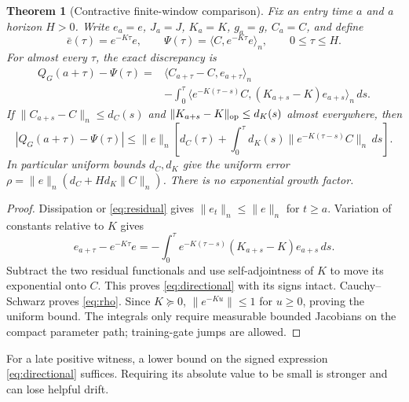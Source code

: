 \documentclass[10pt]{article}
\newtheorem{theorem}{Theorem}[section]
\newcommand{\ip}[2]{\langle #1,#2\rangle_n}
\begin{document}
\begin{theorem}[Contractive finite-window comparison]\label{thm:comparison}
Fix an entry time $a$ and a horizon $H>0$. Write
$e_a=e$, $J_a=J$, $K_a=K$, $g_a=g$, $C_a=C$, and define
\[
 \bar e(\tau)=e^{-K\tau}e,\qquad
 \Psi(\tau)=\ip{C}{e^{-K\tau}e},\qquad 0\le\tau\le H.
\]
For almost every $\tau$, the exact discrepancy is
\begin{equation}\label{eq:directional}
\begin{split}
 Q_G(a+\tau)-\Psi(\tau)={}&\ip{C_{a+\tau}-C}{e_{a+\tau}}\\
 &-\int_0^\tau
 \ip{e^{-K(\tau-s)}C}{(K_{a+s}-K)e_{a+s}}\,ds.
\end{split}
\end{equation}
If $\|C_{a+s}-C\|_n\le d_C(s)$ and
$\|K_{a+s}-K\|_{\rm op}\le d_K(s)$ almost everywhere, then
\begin{equation}\label{eq:rho}
 |Q_G(a+\tau)-\Psi(\tau)|\le
 \|e\|_n\left[d_C(\tau)+\int_0^\tau
 d_K(s)\|e^{-K(\tau-s)}C\|_n\,ds\right].
\end{equation}
In particular uniform bounds $d_C,d_K$ give the uniform error
$\rho=\|e\|_n(d_C+H d_K\|C\|_n)$. There is no exponential growth factor.
\end{theorem}
\begin{proof}
Dissipation or \eqref{eq:residual} gives
$\|e_t\|_n\le\|e\|_n$ for $t\ge a$. Variation of constants relative to
$K$ gives
\[
 e_{a+\tau}-e^{-K\tau}e
 =-\int_0^\tau e^{-K(\tau-s)}(K_{a+s}-K)e_{a+s}\,ds.
\]
Subtract the two residual functionals and use self-adjointness of $K$ to
move its exponential onto $C$. This proves \eqref{eq:directional} with its
signs intact. Cauchy--Schwarz proves \eqref{eq:rho}. Since $K\succeq0$,
$\|e^{-Ku}\|\le1$ for $u\ge0$, proving the uniform bound. The integrals
only require measurable bounded Jacobians on the compact parameter path;
training-gate jumps are allowed.
\end{proof}
For a late positive witness, a lower bound on the signed expression
\eqref{eq:directional} suffices. Requiring its absolute value to be small
is stronger and can lose helpful drift.
\end{document}

